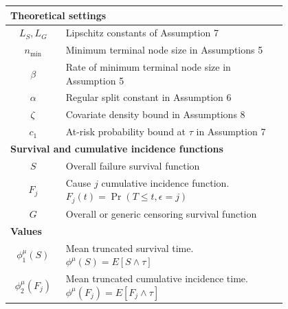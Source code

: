 \begin{longtable}{|c|p{0.8\linewidth}|}
    \hline
    \multicolumn{2}{|l|}{\textbf{Theoretical settings}} \\
    \hline
    $L_S, L_G$ & Lipschitz constants of Assumption 7 \\
    $n_{\text{min}}$ & Minimum terminal node size in Assumptions 5 \\
    $\beta$ & Rate of minimum terminal node size in Assumption 5 \\
    $\alpha$ & Regular split constant in Assumption 6 \\
    $\zeta$ & Covariate density bound in Assumptions 8 \\
    $c_1$ & At-risk probability bound at $\tau$ in Assumption 7 \\
    \hline
    \multicolumn{2}{|l|}{\textbf{Survival and cumulative incidence functions}} \\
    \hline
    $S$ & Overall failure survival function \\
    $F_j$ & Cause $j$ cumulative incidence function. $F_j(t) = \Pr(T \leq t, \epsilon = j)$ \\
    $G$ & Overall or generic censoring survival function \\
    \hline
    \multicolumn{2}{|l|}{\textbf{Values}} \\
    \hline
    $\phi_1^{\mu}(S)$ & Mean truncated survival time. $\phi^{\mu}(S) = E[S \wedge \tau]$ \\
    $\phi_2^{\mu}(F_j)$ & Mean truncated cumulative incidence time. $\phi^{\mu}(F_j) = E[F_j \wedge \tau]$ \\
    \hline
\end{longtable}
